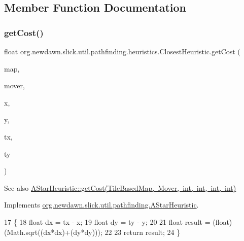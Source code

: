 \subsection{Member Function Documentation}
\mbox{\label{classorg_1_1newdawn_1_1slick_1_1util_1_1pathfinding_1_1heuristics_1_1_closest_heuristic_a2f983a6c190b2a3c76a873b2b4e4d40b}} 
\subsubsection{\texorpdfstring{get\+Cost()}{getCost()}}
{\footnotesize\ttfamily float org.\+newdawn.\+slick.\+util.\+pathfinding.\+heuristics.\+Closest\+Heuristic.\+get\+Cost (\begin{DoxyParamCaption}\item[{\mbox{\hyperlink{interfaceorg_1_1newdawn_1_1slick_1_1util_1_1pathfinding_1_1_tile_based_map}{Tile\+Based\+Map}}}]{map,  }\item[{\mbox{\hyperlink{interfaceorg_1_1newdawn_1_1slick_1_1util_1_1pathfinding_1_1_mover}{Mover}}}]{mover,  }\item[{int}]{x,  }\item[{int}]{y,  }\item[{int}]{tx,  }\item[{int}]{ty }\end{DoxyParamCaption})\hspace{0.3cm}{\ttfamily [inline]}}

\begin{DoxySeeAlso}{See also}
\mbox{\hyperlink{interfaceorg_1_1newdawn_1_1slick_1_1util_1_1pathfinding_1_1_a_star_heuristic_a6655bf4053ece54e62beec26876ad285}{A\+Star\+Heuristic\+::get\+Cost(\+Tile\+Based\+Map, Mover, int, int, int, int)}} 
\end{DoxySeeAlso}


Implements \mbox{\hyperlink{interfaceorg_1_1newdawn_1_1slick_1_1util_1_1pathfinding_1_1_a_star_heuristic_a6655bf4053ece54e62beec26876ad285}{org.\+newdawn.\+slick.\+util.\+pathfinding.\+A\+Star\+Heuristic}}.


\begin{DoxyCode}
17                                                                                       \{     
18         \textcolor{keywordtype}{float} dx = tx - x;
19         \textcolor{keywordtype}{float} dy = ty - y;
20         
21         \textcolor{keywordtype}{float} result = (float) (Math.sqrt((dx*dx)+(dy*dy)));
22         
23         \textcolor{keywordflow}{return} result;
24     \}
\end{DoxyCode}
